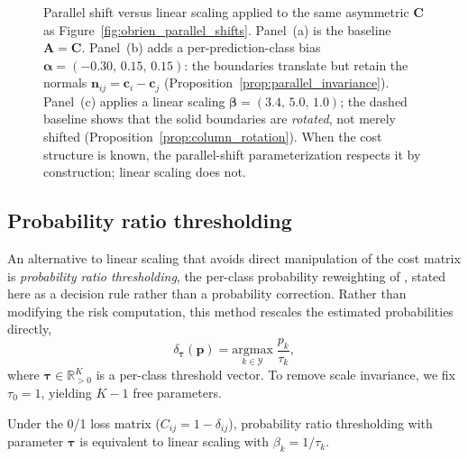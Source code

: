 \begin{figure}[H]
    \centering
    \resizebox{\textwidth}{!}{}
    \caption{Parallel shift versus linear scaling applied to the same asymmetric $\mathbf{C}$ as Figure~\ref{fig:obrien_parallel_shifts}. Panel~(a) is the baseline $\mathbf{A}=\mathbf{C}$. Panel~(b) adds a per-prediction-class bias $\boldsymbol{\alpha}=(-0.30,\,0.15,\,0.15)$: the boundaries translate but retain the normals $\mathbf{n}_{ij}=\mathbf{c}_i-\mathbf{c}_j$ (Proposition~\ref{prop:parallel_invariance}). Panel~(c) applies a linear scaling $\boldsymbol{\beta}=(3.4,\,5.0,\,1.0)$; the dashed baseline shows that the solid boundaries are \emph{rotated}, not merely shifted (Proposition~\ref{prop:column_rotation}). When the cost structure is known, the parallel-shift parameterization respects it by construction; linear scaling does not.}\label{fig:obrien_vs_column_scaling}
\end{figure}

\subsection{Probability ratio thresholding}\label{sec:prob_ratio_thresholding}

An alternative to linear scaling that avoids direct manipulation of the cost matrix is \textit{probability ratio thresholding}, the per-class probability reweighting of \citet{lachiche2003improving}, stated here as a decision rule rather than a probability correction. Rather than modifying the risk computation, this method rescales the estimated probabilities directly,
\begin{equation}\label{eq:threshold_ratio}
    \delta_{\boldsymbol{\tau}}(\mathbf{p}) = \underset{k \in \mathcal{Y}}{\mathrm{argmax}} \; \frac{p_k}{\tau_k},
\end{equation}
where $\boldsymbol{\tau} \in \mathbb{R}_{>0}^K$ is a per-class threshold vector. To remove scale invariance, we fix $\tau_0 = 1$, yielding $K-1$ free parameters.

\begin{proposition}\label{prop:ratio_equivalence}
    Under the 0/1 loss matrix ($C_{ij} = 1 - \delta_{ij}$), probability ratio thresholding with parameter $\boldsymbol{\tau}$ is equivalent to linear scaling with $\beta_k = 1/\tau_k$.
\end{proposition}

